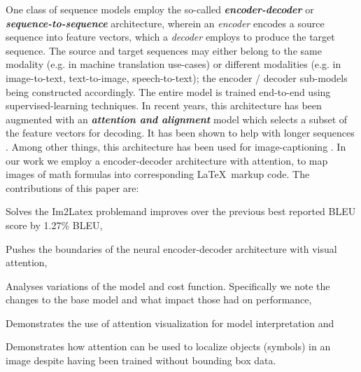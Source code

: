 \documentclass{article}
\begin{document}
One class of sequence models employ the so-called \textbf{\emph{encoder-decoder}} \cite{Cho2014LearningPR} or \textbf{\emph{sequence-to-sequence}}  \cite{Sutskever2014SequenceTS} architecture, wherein an \emph{encoder} encodes a source sequence into feature vectors, which a \emph{decoder} employs to produce the target sequence. The source and target sequences may either belong to the same modality (e.g. in machine translation use-cases) or different modalities (e.g. in image-to-text, text-to-image, speech-to-text); the encoder / decoder sub-models being constructed accordingly. The entire model is trained end-to-end using supervised-learning techniques. In recent years, this architecture has been augmented with an \textbf{\emph{attention and alignment }} model which selects a subset of the feature vectors for decoding. It has been shown to help with longer sequences \cite{Bahdanau2014NeuralMT, DBLP:journals/corr/LuongPM15}. Among other things, this architecture has been used for image-captioning \cite{Xu2015ShowAA}.
In our work we employ a encoder-decoder architecture with attention, to map images of math formulas into corresponding \LaTeX ~markup code.
The contributions of this paper are:
\begin{enumerate*}[label=\arabic*)]
	\item Solves the Im2Latex problem\footnotemark[100] and improves over the previous best reported BLEU score by 1.27\% BLEU, 
	\item Pushes the boundaries of the neural encoder-decoder architecture with visual attention, 
	\item Analyses variations of the model and cost function. Specifically we note the changes to the base model \cite{Xu2015ShowAA} and what impact those had on performance,  
	\item Demonstrates the use of attention visualization for model interpretation and
	\item Demonstrates how attention can be used to localize objects (symbols) in an image despite having been trained without bounding box data.
\end{enumerate*}
\end{document}
